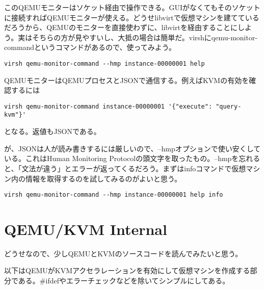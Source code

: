 \documentclass[9pt,b5paper,tombo]{jsbook}
\begin{document}
このQEMUモニターはソケット経由で操作できる。GUIがなくてもそのソケットに接続すればQEMUモニターが使える。どうせlibvirtで仮想マシンを建てているだろうから、QEMUのモニターを直接使わずに、libvirtを経由することにしよう。実はそちらの方が見やすいし、大抵の場合は簡単だ。virshにqemu-monitor-commandというコマンドがあるので、使ってみよう。

\begin{lstlisting}
virsh qemu-monitor-command --hmp instance-00000001 help
\end{lstlisting}

QEMUモニターはQEMUプロセスとJSONで通信する。例えばKVMの有効を確認するには

\begin{lstlisting}
virsh qemu-monitor-command instance-00000001 '{"execute": "query-kvm"}'
\end{lstlisting}

となる。返値もJSONである。

が、JSONは人が読み書きするには厳しいので、--hmpオプションで使い安くしている。これはHuman Monitoring Protocolの頭文字を取ったもの。--hmpを忘れると、「文法が違う」とエラーが返ってくるだろう。まずはinfoコマンドで仮想マシン内の情報を取得するのを試してみるのがよいと思う。

\begin{lstlisting}
virsh qemu-monitor-command --hmp instance-00000001 help info
\end{lstlisting}

\section{QEMU/KVM Internal}

どうせなので、少しQEMUとKVMのソースコードを読んでみたいと思う。

以下はQEMUがKVMアクセラレーションを有効にして仮想マシンを作成する部分である。\#ifdefやエラーチェックなどを除いてシンプルにしてある。
\end{document}
